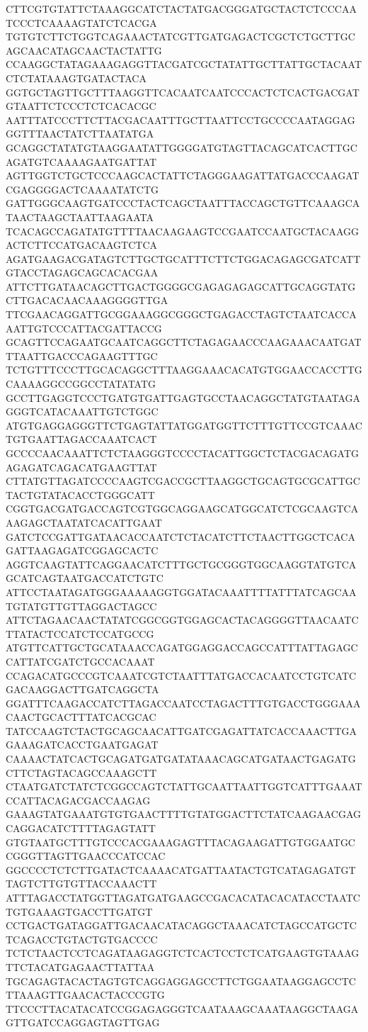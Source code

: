 CTTCGTGTATTCTAAAGGCATCTACTATGACGGGATGCTACTCTCCCAATCCCTCAAAAGTATCTCACGA
TGTGTCTTCTGGTCAGAAACTATCGTTGATGAGACTCGCTCTGCTTGCAGCAACATAGCAACTACTATTG
CCAAGGCTATAGAAAGAGGTTACGATCGCTATATTGCTTATTGCTACAATCTCTATAAAGTGATACTACA
GGTGCTAGTTGCTTTAAGGTTCACAATCAATCCCACTCTCACTGACGATGTAATTCTCCCTCTCACACGC
AATTTATCCCTTCTTACGACAATTTGCTTAATTCCTGCCCCAATAGGAGGGTTTAACTATCTTAATATGA
GCAGGCTATATGTAAGGAATATTGGGGATGTAGTTACAGCATCACTTGCAGATGTCAAAAGAATGATTAT
AGTTGGTCTGCTCCCAAGCACTATTCTAGGGAAGATTATGACCCAAGATCGAGGGGACTCAAAATATCTG
GATTGGGCAAGTGATCCCTACTCAGCTAATTTACCAGCTGTTCAAAGCATAACTAAGCTAATTAAGAATA
TCACAGCCAGATATGTTTTAACAAGAAGTCCGAATCCAATGCTACAAGGACTCTTCCATGACAAGTCTCA
AGATGAAGACGATAGTCTTGCTGCATTTCTTCTGGACAGAGCGATCATTGTACCTAGAGCAGCACACGAA
ATTCTTGATAACAGCTTGACTGGGGCGAGAGAGAGCATTGCAGGTATGCTTGACACAACAAAGGGGTTGA
TTCGAACAGGATTGCGGAAAGGCGGGCTGAGACCTAGTCTAATCACCAAATTGTCCCATTACGATTACCG
GCAGTTCCAGAATGCAATCAGGCTTCTAGAGAACCCAAGAAACAATGATTTAATTGACCCAGAAGTTTGC
TCTGTTTCCCTTGCACAGGCTTTAAGGAAACACATGTGGAACCACCTTGCAAAAGGCCGGCCTATATATG
GCCTTGAGGTCCCTGATGTGATTGAGTGCCTAACAGGCTATGTAATAGAGGGTCATACAAATTGTCTGGC
ATGTGAGGAGGGTTCTGAGTATTATGGATGGTTCTTTGTTCCGTCAAACTGTGAATTAGACCAAATCACT
GCCCCAACAAATTCTCTAAGGGTCCCCTACATTGGCTCTACGACAGATGAGAGATCAGACATGAAGTTAT
CTTATGTTAGATCCCCAAGTCGACCGCTTAAGGCTGCAGTGCGCATTGCTACTGTATACACCTGGGCATT
CGGTGACGATGACCAGTCGTGGCAGGAAGCATGGCATCTCGCAAGTCAAAGAGCTAATATCACATTGAAT
GATCTCCGATTGATAACACCAATCTCTACATCTTCTAACTTGGCTCACAGATTAAGAGATCGGAGCACTC
AGGTCAAGTATTCAGGAACATCTTTGCTGCGGGTGGCAAGGTATGTCAGCATCAGTAATGACCATCTGTC
ATTCCTAATAGATGGGAAAAAGGTGGATACAAATTTTATTTATCAGCAATGTATGTTGTTAGGACTAGCC
ATTCTAGAACAACTATATCGGCGGTGGAGCACTACAGGGGTTAACAATCTTATACTCCATCTCCATGCCG
ATGTTCATTGCTGCATAAACCAGATGGAGGACCAGCCATTTATTAGAGCCATTATCGATCTGCCACAAAT
CCAGACATGCCCGTCAAATCGTCTAATTTATGACCACAATCCTGTCATCGACAAGGACTTGATCAGGCTA
GGATTTCAAGACCATCTTAGACCAATCCTAGACTTTGTGACCTGGGAAACAACTGCACTTTATCACGCAC
TATCCAAGTCTACTGCAGCAACATTGATCGAGATTATCACCAAACTTGAGAAAGATCACCTGAATGAGAT
CAAAACTATCACTGCAGATGATGATATAAACAGCATGATAACTGAGATGCTTCTAGTACAGCCAAAGCTT
CTAATGATCTATCTCGGCCAGTCTATTGCAATTAATTGGTCATTTGAAATCCATTACAGACGACCAAGAG
GAAAGTATGAAATGTGTGAACTTTTGTATGGACTTCTATCAAGAACGAGCAGGACATCTTTTAGAGTATT
GTGTAATGCTTTGTCCCACGAAAGAGTTTACAGAAGATTGTGGAATGCCGGGTTAGTTGAACCCATCCAC
GGCCCCTCTCTTGATACTCAAAACATGATTAATACTGTCATAGAGATGTTAGTCTTGTGTTACCAAACTT
ATTTAGACCTATGGTTAGATGATGAAGCCGACACATACACATACCTAATCTGTGAAAGTGACCTTGATGT
CCTGACTGATAGGATTGACAACATACAGGCTAAACATCTAGCCATGCTCTCAGACCTGTACTGTGACCCC
TCTCTAACTCCTCAGATAAGAGGTCTCACTCCTCTCATGAAGTGTAAAGTTCTACATGAGAACTTATTAA
TGCAGAGTACACTAGTGTCAGGAGGAGCCTTCTGGAATAAGGAGCCTCTTAAAGTTGAACACTACCCGTG
TTCCCTTACATACATCCGGAGAGGGTCAATAAAGCAAATAAGGCTAAGAGTTGATCCAGGAGTAGTTGAG
